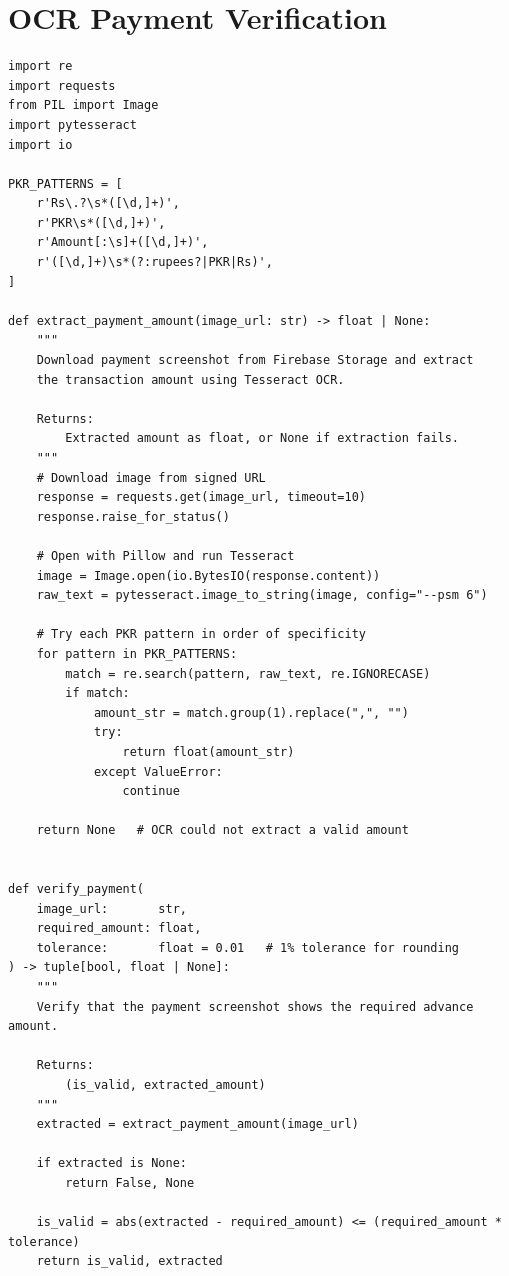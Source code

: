 \section{OCR Payment Verification}
\label{app:code-ocr}

\begin{lstlisting}[style=pythonstyle, caption={OCR payment amount extraction (services/ocr\_service.py).}]
import re
import requests
from PIL import Image
import pytesseract
import io

PKR_PATTERNS = [
    r'Rs\.?\s*([\d,]+)',
    r'PKR\s*([\d,]+)',
    r'Amount[:\s]+([\d,]+)',
    r'([\d,]+)\s*(?:rupees?|PKR|Rs)',
]

def extract_payment_amount(image_url: str) -> float | None:
    """
    Download payment screenshot from Firebase Storage and extract
    the transaction amount using Tesseract OCR.

    Returns:
        Extracted amount as float, or None if extraction fails.
    """
    # Download image from signed URL
    response = requests.get(image_url, timeout=10)
    response.raise_for_status()

    # Open with Pillow and run Tesseract
    image = Image.open(io.BytesIO(response.content))
    raw_text = pytesseract.image_to_string(image, config="--psm 6")

    # Try each PKR pattern in order of specificity
    for pattern in PKR_PATTERNS:
        match = re.search(pattern, raw_text, re.IGNORECASE)
        if match:
            amount_str = match.group(1).replace(",", "")
            try:
                return float(amount_str)
            except ValueError:
                continue

    return None   # OCR could not extract a valid amount


def verify_payment(
    image_url:       str,
    required_amount: float,
    tolerance:       float = 0.01   # 1% tolerance for rounding
) -> tuple[bool, float | None]:
    """
    Verify that the payment screenshot shows the required advance amount.

    Returns:
        (is_valid, extracted_amount)
    """
    extracted = extract_payment_amount(image_url)

    if extracted is None:
        return False, None

    is_valid = abs(extracted - required_amount) <= (required_amount * tolerance)
    return is_valid, extracted
\end{lstlisting}

